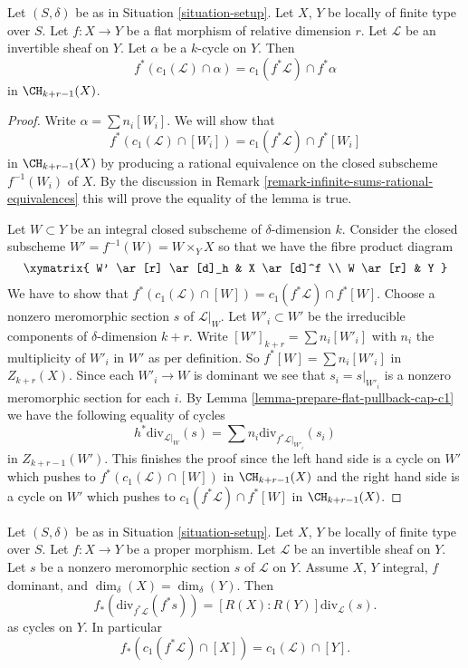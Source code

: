 \begin{lemma}
\label{lemma-flat-pullback-cap-c1}
Let $(S, \delta)$ be as in Situation \ref{situation-setup}.
Let $X$, $Y$ be locally of finite type over $S$.
Let $f : X \to Y$ be a flat morphism of relative dimension $r$.
Let $\mathcal{L}$ be an invertible sheaf on $Y$.
Let $\alpha$ be a $k$-cycle on $Y$.
Then
$$
f^*(c_1(\mathcal{L}) \cap \alpha) = c_1(f^*\mathcal{L}) \cap f^*\alpha
$$
in $\CH_{k + r - 1}(X)$.
\end{lemma}

\begin{proof}
Write $\alpha = \sum n_i[W_i]$. We will show that
$$
f^*(c_1(\mathcal{L}) \cap [W_i]) = c_1(f^*\mathcal{L}) \cap f^*[W_i]
$$
in $\CH_{k + r - 1}(X)$ by producing a rational equivalence
on the closed subscheme $f^{-1}(W_i)$ of $X$.
By the discussion in
Remark \ref{remark-infinite-sums-rational-equivalences}
this will prove the equality of the lemma is true.

\medskip\noindent
Let $W \subset Y$ be an integral closed subscheme of $\delta$-dimension $k$.
Consider the closed subscheme $W' = f^{-1}(W) = W \times_Y X$
so that we have the fibre product diagram
$$
\xymatrix{
W' \ar[r] \ar[d]_h & X \ar[d]^f \\
W \ar[r] & Y
}
$$
We have to show that
$f^*(c_1(\mathcal{L}) \cap [W]) = c_1(f^*\mathcal{L}) \cap f^*[W]$.
Choose a nonzero meromorphic section $s$ of $\mathcal{L}|_W$.
Let $W'_i \subset W'$ be the irreducible components of
$\delta$-dimension $k + r$. Write $[W']_{k + r} = \sum n_i[W'_i]$
with $n_i$ the multiplicity of $W'_i$ in $W'$ as per definition.
So $f^*[W] = \sum n_i[W'_i]$ in $Z_{k + r}(X)$.
Since each $W'_i \to W$ is dominant we
see that $s_i = s|_{W'_i}$ is a nonzero meromorphic section for
each $i$. By Lemma \ref{lemma-prepare-flat-pullback-cap-c1}
we have the following equality of cycles
$$
h^*\text{div}_{\mathcal{L}|_W}(s) =
\sum n_i\text{div}_{f^*\mathcal{L}|_{W'_i}}(s_i)
$$
in $Z_{k + r - 1}(W')$. This finishes the proof since
the left hand side is a cycle on $W'$ which pushes to
$f^*(c_1(\mathcal{L}) \cap [W])$ in $\CH_{k + r - 1}(X)$
and the right hand side is a cycle on $W'$ which pushes to
$c_1(f^*\mathcal{L}) \cap f^*[W]$ in $\CH_{k + r - 1}(X)$.
\end{proof}

\begin{lemma}
\label{lemma-equal-c1-as-cycles}
Let $(S, \delta)$ be as in Situation \ref{situation-setup}.
Let $X$, $Y$ be locally of finite type over $S$.
Let $f : X \to Y$ be a proper morphism.
Let $\mathcal{L}$ be an invertible sheaf on $Y$.
Let $s$ be a nonzero meromorphic section $s$ of $\mathcal{L}$ on $Y$.
Assume $X$, $Y$ integral, $f$ dominant, and $\dim_\delta(X) = \dim_\delta(Y)$.
Then
$$
f_*\left(\text{div}_{f^*\mathcal{L}}(f^*s)\right) =
[R(X) : R(Y)]\text{div}_\mathcal{L}(s).
$$
as cycles on $Y$. In particular
$$
f_*(c_1(f^*\mathcal{L}) \cap [X]) = c_1(\mathcal{L}) \cap [Y].
$$
\end{lemma}

